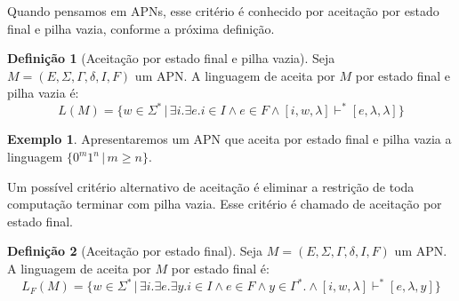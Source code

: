 \documentclass[a4paper]{article}
\theoremstyle{definition}
\newtheorem{Example}{Exemplo}
\newtheorem{Definition}{Definição}
\begin{document}
  Quando pensamos em APNs, esse critério é conhecido por aceitação por estado
  final e pilha vazia, conforme a próxima definição.

  \begin{Definition}[Aceitação por estado final e pilha vazia]
    Seja $M = (E,\Sigma,\Gamma,\delta,I,F)$ um APN. A linguagem de aceita por $M$
    por estado final e pilha vazia é:
    \[
      L(M) = \{w\in\Sigma^*\,|\,\exists i.\exists e. i\in I \land e\in F \land [i,w,\lambda]\vdash^*[e,\lambda,\lambda]\}
    \]
  \end{Definition}

  \begin{Example}
    Apresentaremos um APN que aceita por estado final e pilha vazia a linguagem
    $\{0^m1^n\,|\,m \geq n\}$.
    \begin{figure}[H]
      \centering
    \end{figure}
  \end{Example}
  
  Um possível critério alternativo de aceitação é eliminar a restrição de toda
  computação terminar com pilha vazia. Esse critério é chamado de aceitação por
  estado final.

  \begin{Definition}[Aceitação por estado final]
    Seja $M = (E,\Sigma,\Gamma,\delta,I,F)$ um APN. A linguagem de aceita por $M$
    por estado final é:
    \[
      L_F(M) = \{w\in\Sigma^*\,|\,\exists i.\exists e. \exists y. i\in I \land
      e\in F \land y \in
      \Gamma^*.\land [i,w,\lambda]\vdash^*[e,\lambda,y]\}
    \]
  \end{Definition}
\end{document}
